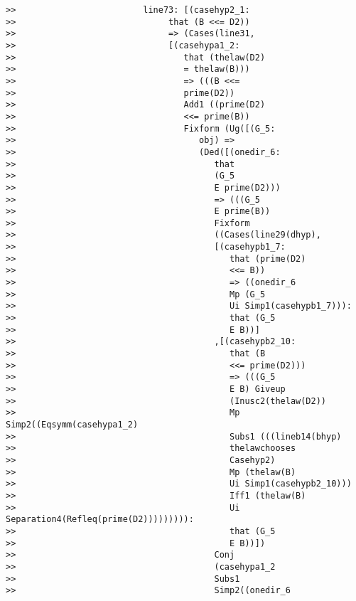 \documentclass[12pt]{article}
\begin{document}
\begin{verbatim}
>>                         line73: [(casehyp2_1:
>>                              that (B <<= D2))
>>                              => (Cases(line31,
>>                              [(casehypa1_2:
>>                                 that (thelaw(D2)
>>                                 = thelaw(B)))
>>                                 => (((B <<=
>>                                 prime(D2))
>>                                 Add1 ((prime(D2)
>>                                 <<= prime(B))
>>                                 Fixform (Ug([(G_5:
>>                                    obj) =>
>>                                    (Ded([(onedir_6:
>>                                       that
>>                                       (G_5
>>                                       E prime(D2)))
>>                                       => (((G_5
>>                                       E prime(B))
>>                                       Fixform
>>                                       ((Cases(line29(dhyp),
>>                                       [(casehypb1_7:
>>                                          that (prime(D2)
>>                                          <<= B))
>>                                          => ((onedir_6
>>                                          Mp (G_5
>>                                          Ui Simp1(casehypb1_7))):
>>                                          that (G_5
>>                                          E B))]
>>                                       ,[(casehypb2_10:
>>                                          that (B
>>                                          <<= prime(D2)))
>>                                          => (((G_5
>>                                          E B) Giveup
>>                                          (Inusc2(thelaw(D2))
>>                                          Mp Simp2((Eqsymm(casehypa1_2)
>>                                          Subs1 (((lineb14(bhyp)
>>                                          thelawchooses
>>                                          Casehyp2)
>>                                          Mp (thelaw(B)
>>                                          Ui Simp1(casehypb2_10)))
>>                                          Iff1 (thelaw(B)
>>                                          Ui Separation4(Refleq(prime(D2))))))))):
>>                                          that (G_5
>>                                          E B))])
>>                                       Conj
>>                                       (casehypa1_2
>>                                       Subs1
>>                                       Simp2((onedir_6

\end{verbatim}
\end{document}

